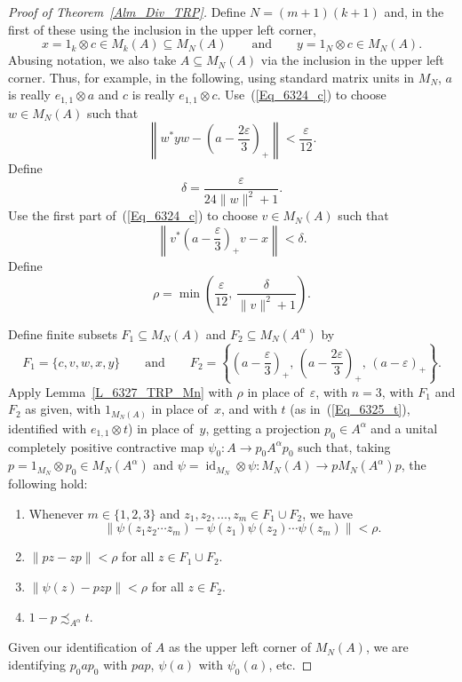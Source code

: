 \documentclass[10pt]{amsart}
\numberwithin{equation}{section}
\theoremstyle{definition}
\newcommand{\af}{\alpha}
\newcommand{\dt}{\delta}
\newcommand{\ep}{\varepsilon}
\newcommand{\ps}{\psi}
\newcommand{\rh}{\rho}
\newcommand{\id}{{\operatorname{id}}}
\newcommand{\andeqn}{\qquad {\mbox{and}} \qquad}
\renewcommand{\S}{\subseteq}
\begin{document}
\begin{proof}[Proof of Theorem~\ref{Alm_Div_TRP}]
Define $N = (m + 1) (k + 1)$ and,
in the first of these using the inclusion in the upper left corner,
\[
x = 1_{k} \otimes c \in M_{k} (A) \S M_N (A)
\andeqn
y = 1_{N} \otimes c \in M_N (A).
\]
Abusing notation, we also take $A \S M_N (A)$
via the inclusion in the upper left corner.
Thus, for example, in the following, using standard matrix units in $M_N$,
$a$ is really $e_{1, 1} \otimes a$
and $c$ is really $e_{1, 1} \otimes c$.
Use~(\ref{Eq_6324_c}) to choose $w \in M_N (A)$ such that
%
\begin{equation}\label{Eq_6325_wsyw}
\left\| w^* y w - \left( a - \frac{2 \ep}{3} \right)_+ \right\|
  < \frac{\ep}{12}.
\end{equation}
%
Define
%
\begin{equation}\label{Eq_6325_dt}
\dt = \frac{\ep}{24 \| w \|^2 + 1}.
\end{equation}
%
Use the first part of~(\ref{Eq_6324_c}) to choose $v \in M_N (A)$ such that
%
\begin{equation}\label{Eq_6325_vsav}
\left\| v^* \left( a - \frac{\ep}{3} \right)_+ v - x \right\| < \dt.
\end{equation}
%
Define
%
\begin{equation}\label{Eq_6325_rh}
\rh = \min \left( \frac{\ep}{12}, \,  \frac{\dt}{\| v \|^2 + 1} \right).
\end{equation}
%

Define finite subsets $F_1 \S M_N (A)$ and $F_2 \S M_N (A^{\af})$ by
\[
F_1 = \bigl\{ c, v, w, x, y \bigr\}
\andeqn
F_2 = \left\{ \left( a - \frac{\ep}{3} \right)_+, \,
          \left( a - \frac{2 \ep}{3} \right)_+, \, (a - \ep)_{+} \right\}.
\]
Apply Lemma~\ref{L_6327_TRP_Mn} with $\rh$ in place of~$\ep$,
with $n = 3$, with $F_1$ and $F_2$ as given,
with $1_{M_N (A)}$ in place of~$x$,
and with $t$ (as in~(\ref{Eq_6325_t}), identified with $e_{1, 1} \otimes t$)
in place of~$y$,
getting a projection $p_0 \in A^{\alpha}$ and a
unital completely positive contractive map
$\psi_0 \colon A \to p_0 A^{\alpha} p_0$ such that,
taking $p = 1_{M_N} \otimes p_0 \in M_N (A^{\alpha})$
and $\ps = \id_{M_N} \otimes \ps \colon M_N (A) \to p M_N (A^{\alpha}) p$,
the following hold:
%
\begin{enumerate}
%
\item\label{I_6324_Item_1X07_18}
Whenever $m \in \{ 1, 2, 3 \}$
and $z_1, z_2, \ldots, z_m \in F_1 \cup F_2$, we have
\[
\bigl\| \psi (z_1 z_2 \cdots z_m)
  - \psi (z_1) \psi (z_2) \cdots \psi (z_m) \bigr\|
   < \rh.
\]
%
\item\label{I_6324_commute1469}
$\| p z - z p \| < \rh$ for all $z \in F_{1} \cup F_{2}$.
%
\item\label{I_6324_Item_1X07_21}
$\| \psi (z) - p z p \| < \rh$ for all $z \in F_2$.
%
\item\label{I_6324_Item_1X07_20}
$1 - p \precsim_{A^{\alpha}} t$.
\end{enumerate}
%
Given our identification of $A$ as the upper left corner of $M_N (A)$,
we are identifying $p_0 a p_0$ with $p a p$, $\ps (a)$ with $\ps_0 (a)$,
etc.


\end{proof}
\end{document}
